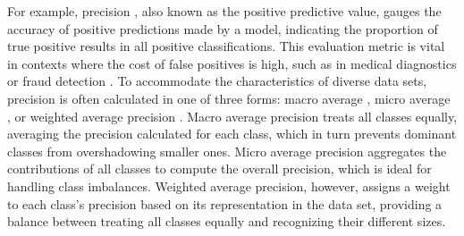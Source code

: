 \documentclass{article}
\begin{document}
For example, precision \cite{altman1994statistics, fletcher2019clinical}, also known as the positive predictive value, gauges the accuracy of positive predictions made by a model, indicating the proportion of true positive results in all positive classifications. This evaluation metric is vital in contexts where the cost of false positives is high, such as in medical diagnostics \cite{kononenko2001machine, ahsan2022machine} or fraud detection \cite{ashtiani2021intelligent, ali2022financial}. To accommodate the characteristics of diverse data sets, precision is often calculated in one of three forms: macro average \cite{yang1999evaluation, sebastiani2002machine, zhu2004recall, he2018local}, micro average \cite{yang1999evaluation, sebastiani2002machine}, or weighted average precision \cite{han2014rule}. Macro average precision treats all classes equally, averaging the precision calculated for each class, which in turn prevents dominant classes from overshadowing smaller ones. Micro average precision aggregates the contributions of all classes to compute the overall precision, which is ideal for handling class imbalances. Weighted average precision, however, assigns a weight to each class's precision based on its representation in the data set, providing a balance between treating all classes equally and recognizing their different sizes.
\end{document}
